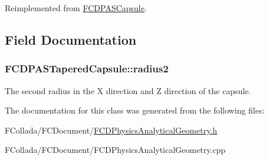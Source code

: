 Reimplemented from \hyperlink{classFCDPASCapsule_ad857a4a8159f4928d7260ed38fc46c22}{FCDPASCapsule}.



\subsection{Field Documentation}
\hypertarget{classFCDPASTaperedCapsule_a34e3bbbe3c80a574b69bb4e9e9a80016}{
\subsubsection[{radius2}]{ {\bf FCDPASTaperedCapsule::radius2}}}
\label{classFCDPASTaperedCapsule_a34e3bbbe3c80a574b69bb4e9e9a80016}
The second radius in the X direction and Z direction of the capsule. 

The documentation for this class was generated from the following files:\begin{DoxyCompactItemize}
\item 
FCollada/FCDocument/\hyperlink{FCDPhysicsAnalyticalGeometry_8h}{FCDPhysicsAnalyticalGeometry.h}\item 
FCollada/FCDocument/FCDPhysicsAnalyticalGeometry.cpp\end{DoxyCompactItemize}
